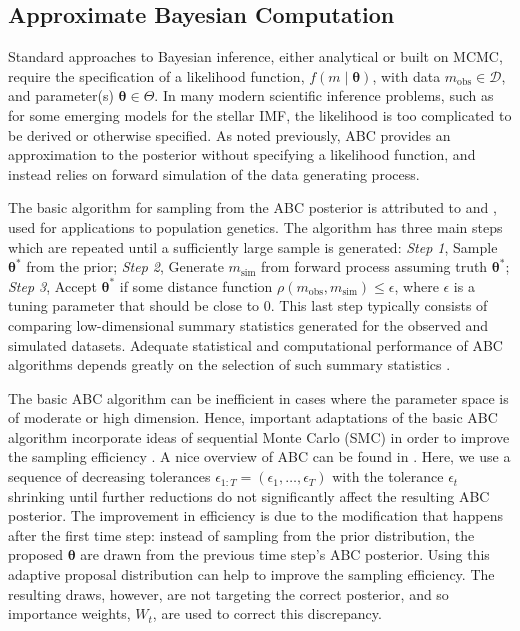 \documentclass[ejs]{imsart}
\numberwithin{equation}{section}
\theoremstyle{plain}
\newcommand{\btheta}{\boldsymbol{\theta}}
\newcommand{\msim}{m_{\text{sim}}}
\newcommand{\mobs}{m_{\text{obs}}}
\begin{document}
\subsection{Approximate Bayesian Computation}

Standard approaches to Bayesian inference, either analytical or built on
MCMC, require the specification of a
likelihood function, $f(m \mid \btheta)$, with data $\mobs \in \mathcal D$, 
and parameter(s) $\btheta \in \Theta$. In many modern scientific inference 
problems, such as for some emerging models for the stellar IMF, the likelihood is too complicated to be derived or otherwise
specified. 
As noted previously, ABC provides an approximation to the posterior
without specifying a likelihood function, and instead relies on forward simulation of the data generating
process.

The basic algorithm for sampling from the ABC posterior is attributed to 
\cite{TavareEtAl1997} and \cite{PitchardEtAl1999}, used for applications to population 
genetics. The algorithm has three main steps which are repeated until a sufficiently
large sample is generated:
\emph{Step 1}, Sample $\btheta^*$ from the prior; \emph{Step 2}, 
Generate $\msim$ from forward process assuming truth $\btheta^*$; 
 \emph{Step 3},  
Accept $\btheta^*$ if some distance function $\rho(\mobs, \msim) \leq \epsilon$, where $\epsilon$ is a tuning parameter that should be close to 0.
This last step typically consists of comparing low-dimensional summary statistics generated
for the observed and simulated datasets. 
Adequate statistical and computational performance of ABC algorithms depends greatly on the
selection of such summary statistics
\citep{JoyceMarjoram2008,BlumFrancois2010, Blum2010, FearnheadPrangle2012, BlumEtAl2013}.

The basic ABC algorithm can be inefficient in cases where the parameter space is of moderate
or high dimension.
Hence, important adaptations of the basic ABC algorithm incorporate ideas of sequential Monte Carlo (SMC) in 
order to improve the sampling efficiency \citep{MarjoramEtAl2003,SissonEtAl2007,beaumont2009, DelMoralEtAl2011}.  A nice overview of ABC can be found in \cite{MarinEtAl2012}.  
Here, we use a sequence of decreasing tolerances $\epsilon_{1:T} = (\epsilon_1, \ldots, \epsilon_T)$ 
with the tolerance $\epsilon_t$ shrinking until further reductions do not significantly affect the 
resulting ABC posterior.
The improvement in efficiency is due to the modification that happens after the first time step: 
instead of sampling from the prior distribution, the proposed $\btheta$ are drawn from the previous time step's ABC posterior.  Using this adaptive proposal distribution can help to improve the sampling efficiency.  The resulting draws, however, are not targeting the correct posterior, and so importance weights, $W_t$, are used to correct this discrepancy.
\end{document}
